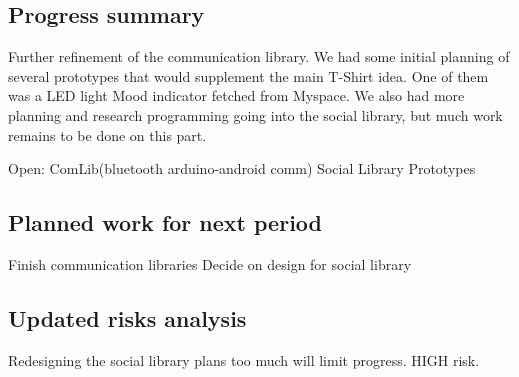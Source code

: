 \subsection{Progress summary}
Further refinement of the communication library. We had some initial planning of several prototypes that would supplement the main T-Shirt idea. One of them was a LED light Mood indicator fetched from Myspace. We also had more planning and research programming going into the social library, but much work remains to be done on this part.

Open:
ComLib(bluetooth arduino-android comm)
Social Library
Prototypes

\subsection{Planned work for next period}
Finish communication libraries
Decide on design for social library

\subsection{Updated risks analysis}
Redesigning the social library plans too much will limit progress. HIGH risk.